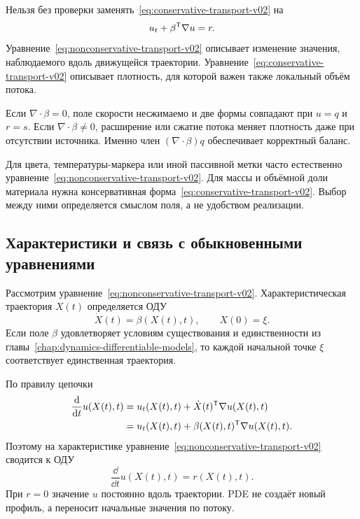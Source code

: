 Нельзя без проверки заменять~\eqref{eq:conservative-transport-v02} на
\begin{equation}
\label{eq:nonconservative-transport-v02}
u_t+\beta^{\mathsf{T}}\nabla u=r.
\end{equation}
Уравнение~\eqref{eq:nonconservative-transport-v02} описывает изменение значения, наблюдаемого вдоль движущейся траектории. Уравнение~\eqref{eq:conservative-transport-v02} описывает плотность, для которой важен также локальный объём потока.

Если $\nabla\cdot\beta=0$, поле скорости несжимаемо и две формы совпадают при $u=q$ и $r=s$. Если $\nabla\cdot\beta\neq0$, расширение или сжатие потока меняет плотность даже при отсутствии источника. Именно член $(\nabla\cdot\beta)q$ обеспечивает корректный баланс.

\begin{caution}
Для цвета, температуры-маркера или иной пассивной метки часто естественно уравнение~\eqref{eq:nonconservative-transport-v02}. Для массы и объёмной доли материала нужна консервативная форма~\eqref{eq:conservative-transport-v02}. Выбор между ними определяется смыслом поля, а не удобством реализации.
\end{caution}

\subsection{Характеристики и связь с обыкновенными уравнениями}

Рассмотрим уравнение~\eqref{eq:nonconservative-transport-v02}. Характеристическая траектория $X(t)$ определяется ОДУ
\begin{equation}
\label{eq:characteristic-ode-v02}
\dot X(t)=\beta(X(t),t),
\qquad
X(0)=\xi.
\end{equation}
Если поле $\beta$ удовлетворяет условиям существования и единственности из главы~\ref{chap:dynamics-differentiable-models}, то каждой начальной точке $\xi$ соответствует единственная траектория.

По правилу цепочки
\begin{align}
\frac{\mathop{}\!\mathrm{d}}{\mathop{}\!\mathrm{d} t}u(X(t),t)
&=
 u_t(X(t),t)
+
\dot X(t)^{\mathsf{T}}\nabla u(X(t),t)
\\
&=
 u_t(X(t),t)
+
\beta(X(t),t)^{\mathsf{T}}\nabla u(X(t),t).
\end{align}
Поэтому на характеристике уравнение~\eqref{eq:nonconservative-transport-v02} сводится к ОДУ
\begin{equation}
\label{eq:value-along-characteristic-v02}
\frac{\dd}{\dd t}u(X(t),t)=r(X(t),t).
\end{equation}
При $r=0$ значение $u$ постоянно вдоль траектории. PDE не создаёт новый профиль, а переносит начальные значения по потоку.


